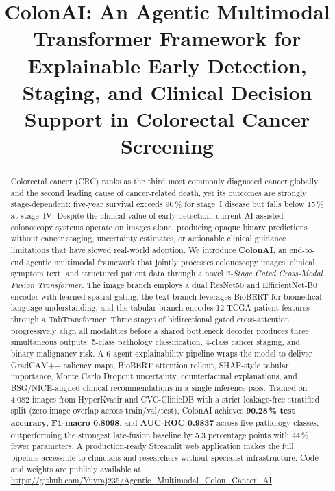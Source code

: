 \documentclass[conference]{IEEEtran}
\begin{document}
\title{ColonAI: An Agentic Multimodal Transformer Framework for\\
       Explainable Early Detection, Staging, and Clinical Decision\\
       Support in Colorectal Cancer Screening}

\author{
}

\maketitle

\begin{abstract}
Colorectal cancer (CRC) ranks as the third most commonly diagnosed cancer
globally and the second leading cause of cancer-related death, yet its outcomes
are strongly stage-dependent: five-year survival exceeds 90\,\% for stage~I
disease but falls below 15\,\% at stage~IV. Despite the clinical value of early
detection, current AI-assisted colonoscopy systems operate on images alone,
producing opaque binary predictions without cancer staging, uncertainty
estimates, or actionable clinical guidance---limitations that have slowed
real-world adoption. We introduce \textbf{ColonAI}, an end-to-end agentic
multimodal framework that jointly processes colonoscopy images, clinical symptom
text, and structured patient data through a novel \emph{3-Stage Gated
Cross-Modal Fusion Transformer}. The image branch employs a dual ResNet50 and
EfficientNet-B0 encoder with learned spatial gating; the text branch leverages
BioBERT for biomedical language understanding; and the tabular branch encodes
12 TCGA patient features through a TabTransformer. Three stages of bidirectional
gated cross-attention progressively align all modalities before a shared
bottleneck decoder produces three simultaneous outputs: 5-class pathology
classification, 4-class cancer staging, and binary malignancy risk. A
6-agent explainability pipeline wraps the model to deliver GradCAM++
saliency maps, BioBERT attention rollout, SHAP-style tabular importance,
Monte Carlo Dropout uncertainty, counterfactual explanations, and
BSG/NICE-aligned clinical recommendations in a single inference pass. Trained
on 4,082 images from HyperKvasir and CVC-ClinicDB with a strict
leakage-free stratified split (zero image overlap across train/val/test),
ColonAI achieves \textbf{90.28\,\% test accuracy}, \textbf{F1-macro 0.8098},
and \textbf{AUC-ROC 0.9837} across five pathology classes, outperforming the
strongest late-fusion baseline by 5.3 percentage points with 44\,\% fewer
parameters. A production-ready Streamlit web application makes the full
pipeline accessible to clinicians and researchers without specialist
infrastructure. Code and weights are publicly available at
\url{https://github.com/Yuvraj235/Agentic_Multimodal_Colon_Cancer_AI}.
\end{abstract}
\end{document}
